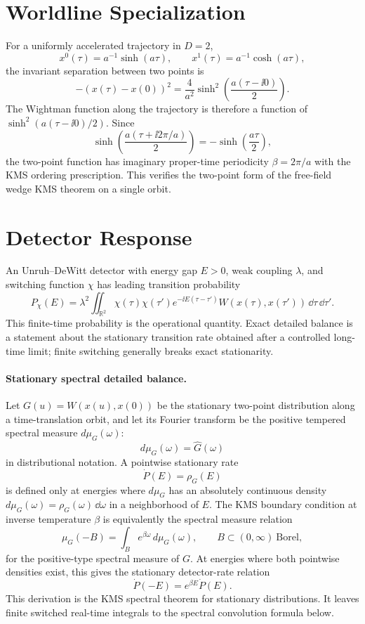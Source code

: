 \section{Worldline Specialization}

For a uniformly accelerated trajectory in \(D=2\),
\[
  x^0(\tau)=a^{-1}\sinh(a\tau),\qquad
  x^1(\tau)=a^{-1}\cosh(a\tau),
\]
the invariant separation between two points is
\[
  -(x(\tau)-x(0))^2
  =
  \frac{4}{a^2}\sinh^2\!\left(\frac{a(\tau-\ii0)}{2}\right).
\]
The Wightman function along the trajectory is therefore a function of
\(\sinh^2(a(\tau-\ii0)/2)\).  Since
\[
  \sinh\!\left(\frac{a(\tau+\ii 2\pi/a)}{2}\right)
  =
  -\sinh\!\left(\frac{a\tau}{2}\right),
\]
the two-point function has imaginary proper-time periodicity
\(\beta=2\pi/a\) with the KMS ordering prescription.  This verifies the
two-point form of the free-field wedge KMS theorem on a single orbit.

\section{Detector Response}

An Unruh--DeWitt detector with energy gap \(E>0\), weak coupling \(\lambda\),
and switching function \(\chi\) has leading transition probability
\begin{equation}
  P_\chi(E)
  =
  \lambda^2
  \iint_{\mathbb R^2}
  \chi(\tau)\chi(\tau')e^{-\ii E(\tau-\tau')}
  W(x(\tau),x(\tau'))\,\dd\tau\,\dd\tau' .
  \label{eq:unruh-finite-switching-probability}
\end{equation}
This finite-time probability is the operational quantity.  Exact detailed
balance is a statement about the stationary transition rate obtained after a
controlled long-time limit; finite switching generally breaks exact
stationarity.

\paragraph{Stationary spectral detailed balance.}
Let \(G(u)=W(x(u),x(0))\) be the stationary two-point distribution along a
time-translation orbit, and let its Fourier transform be the positive
tempered spectral measure \(d\mu_G(\omega)\):
\[
  d\mu_G(\omega)
  =
  \widehat G(\omega)
\]
in distributional notation.  A pointwise stationary rate
\[
  \dot P(E)=\rho_G(E)
\]
is defined only at energies where \(d\mu_G\) has an absolutely continuous
density \(d\mu_G(\omega)=\rho_G(\omega)\,\dd\omega\) in a neighborhood of
\(E\).  The KMS boundary condition at inverse temperature \(\beta\) is
equivalently the spectral measure relation
\begin{equation}
  \mu_G(-B)
  =
  \int_B e^{\beta\omega}\,d\mu_G(\omega),
  \qquad B\subset(0,\infty)\ \text{Borel},
  \label{eq:unruh-spectral-detailed-balance}
\end{equation}
for the positive-type spectral measure of \(G\).  At energies where both
pointwise densities exist, this gives the stationary detector-rate relation
\[
  \dot P(-E)=e^{\beta E}\dot P(E).
\]
This derivation is the KMS spectral theorem for stationary distributions.  It
leaves finite switched real-time integrals to the spectral convolution formula
below.

